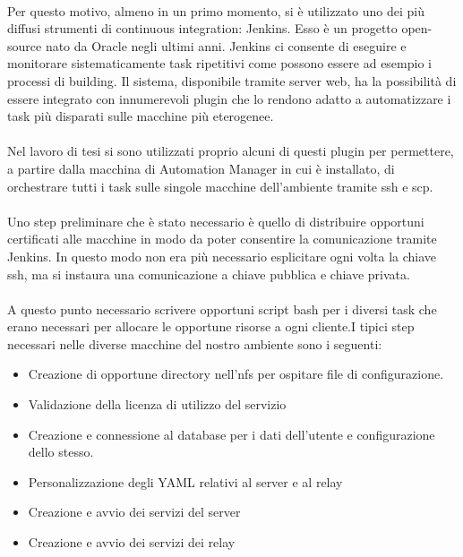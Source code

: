 \paragraph{}
Per questo motivo, almeno in un primo momento, si è utilizzato uno dei più diffusi strumenti di continuous integration: Jenkins. Esso è un progetto open-source nato da Oracle negli ultimi anni. Jenkins ci consente di eseguire e monitorare sistematicamente task ripetitivi come possono essere ad esempio i processi di building. Il sistema, disponibile tramite server web, ha la possibilità di essere integrato con innumerevoli plugin che lo rendono adatto a automatizzare i task più disparati sulle macchine più eterogenee. 
\paragraph{}
Nel lavoro di tesi si sono utilizzati proprio alcuni di questi plugin per permettere, a partire dalla macchina di Automation Manager in cui è installato, di orchestrare tutti i task sulle singole macchine dell'ambiente tramite ssh e scp.
\paragraph{}
Uno step preliminare che è stato necessario è quello di distribuire opportuni certificati alle macchine in modo da poter consentire la comunicazione tramite Jenkins. In questo modo non era più necessario esplicitare ogni volta la chiave ssh, ma si instaura una comunicazione a chiave pubblica e chiave privata. 
\paragraph{}
A questo punto necessario scrivere opportuni script bash per i diversi task che erano necessari per allocare le opportune risorse a ogni cliente.I tipici step necessari nelle diverse macchine del nostro ambiente sono i seguenti:
\begin{itemize}
	\item Creazione di opportune directory nell'nfs per ospitare file di configurazione.
	\item Validazione della licenza di utilizzo del servizio 
	\item Creazione e connessione al database per i dati dell'utente e configurazione dello stesso.
	\item Personalizzazione degli YAML relativi al server e al relay
	\item Creazione e avvio dei servizi del server
	\item Creazione e avvio dei servizi dei relay
\end{itemize}
